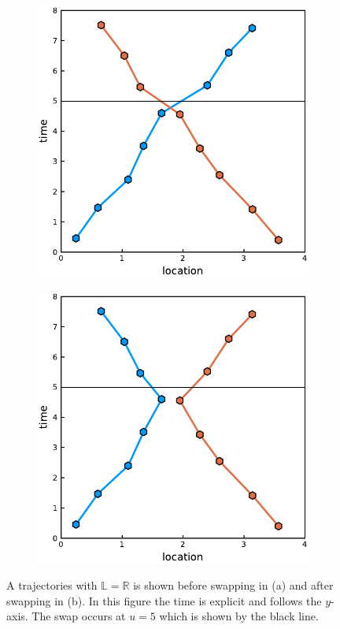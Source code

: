 \documentclass[12pt]{article}
\newcommand{\R}{\mathbb{R}}
\newcommand{\swaptime}{u}
\newcommand{\locset}{\mathbb{L}}
\theoremstyle{definition}
\begin{document}
\begin{figure}
  \centering
  \begin{subfigure}[t]{0.4\textwidth}
    \includegraphics[width=\textwidth]{swapping_tempospatial-a.pdf}
    \caption{}
  \end{subfigure}
  \begin{subfigure}[t]{0.4\textwidth}
    \includegraphics[width=\textwidth]{swapping_tempospatial-b.pdf}
    \caption{}
  \end{subfigure}
  \caption{A trajectories with \(\locset = \R\) is shown before
    swapping in (a) and after swapping in (b). In this figure the
    time is explicit and follows the \(y\)-axis. The swap occurs at
    \(\swaptime = 5\) which is shown by the black line.}
  \label{fig:swapping-tempo-spatial}
\end{figure}
\end{document}
